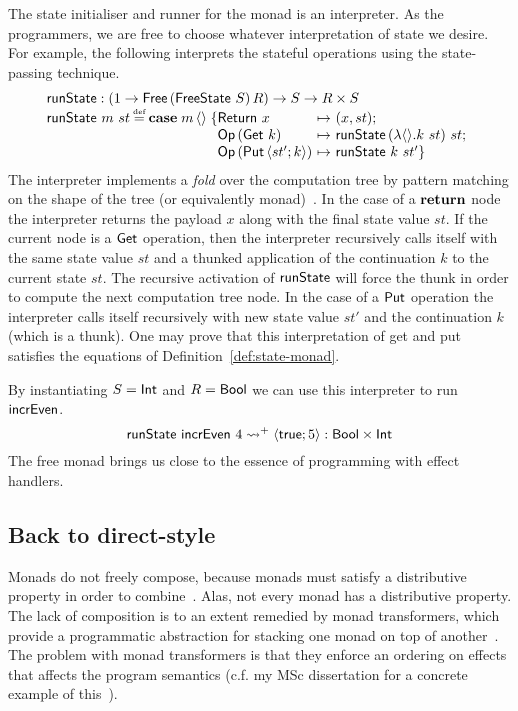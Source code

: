\documentclass[12pt,phd,lfcs,twoside,openright,logo,leftchapter,normalheadings]{infthesis}
\theoremstyle{plain}
\theoremstyle{definition}
\begin{document}
The state initialiser and runner for the monad is an interpreter. As
the programmers, we are free to choose whatever interpretation of
state we desire. For example, the following interprets the stateful
operations using the state-passing technique.
%
\[
  \bl
    \runState : (\UnitType \to \Free\,(\FreeState~S)\,R) \to S \to R \times S\\
    \runState~m~st \defas
      \Case\;m\,\Unit\;\{
      \ba[t]{@{}l@{~}c@{~}l}
         \return~x      &\mapsto& (x, st);\\
         \OpF\,(\Get~k) &\mapsto& \runState\,(\lambda\Unit.k~st)~st;\\
         \OpF\,(\Put\,\Record{st';k}) &\mapsto& \runState~k~st'
      \}\ea
  \el
\]
%
The interpreter implements a \emph{fold} over the computation tree by
pattern matching on the shape of the tree (or equivalently
monad)~\cite{MeijerFP91}. In the case of a $\mathbf{return}$ node the
interpreter returns the payload $x$ along with the final state value
$st$. If the current node is a $\mathsf{Get}$ operation, then the interpreter
recursively calls itself with the same state value $st$ and a thunked
application of the continuation $k$ to the current state $st$. The
recursive activation of $\mathsf{runState}$ will force the thunk in order to
compute the next computation tree node.  In the case of a $\mathsf{Put}$
operation the interpreter calls itself recursively with new state
value $st'$ and the continuation $k$ (which is a thunk). One may prove
that this interpretation of get and put satisfies the equations of
Definition~\ref{def:state-monad}.
%

By instantiating $S = \mathsf{Int}$ and $R = \mathsf{Bool}$ we can use this
interpreter to run $\mathsf{incrEven}$.
%
\[
  \mathsf{runState}~\mathsf{incrEven}~4 \leadsto^+ \langle \mathsf{true};5 \rangle : \mathsf{Bool} \times \mathsf{Int}
\]
%
The free monad brings us close to the essence of programming with
effect handlers.

\subsection{Back to direct-style}
\label{sec:back-to-directstyle}
Monads do not freely compose, because monads must satisfy a
distributive property in order to combine~\cite{KingW92}. Alas, not
every monad has a distributive property.
%
The lack of composition is to an extent remedied by monad
transformers, which provide a programmatic abstraction for stacking
one monad on top of another~\cite{Espinosa95}. The problem with monad
transformers is that they enforce an ordering on effects that affects
the program semantics (c.f. my MSc dissertation for a concrete example
of this~\cite{Hillerstrom15}).
\end{document}
